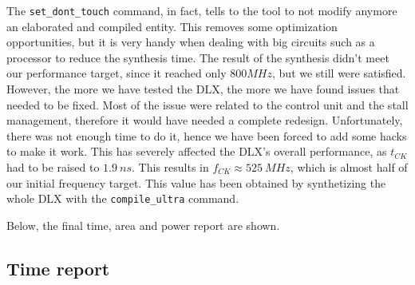 The \verb|set_dont_touch| command, in fact, tells to the tool to not modify anymore an elaborated and compiled entity. This removes some optimization opportunities, but it is very handy
when dealing with big circuits such as a processor to reduce the synthesis time.
The result of the synthesis didn't meet our performance target, since it reached only $800 MHz$, but we still were satisfied. However, the more we have tested the DLX, the more we have found
issues that needed to be fixed. Most of the issue were related to the control unit and the stall management, therefore it would have needed a complete redesign. Unfortunately, there was not enough
time to do it, hence we have been forced to add some hacks to make it work. This has severely affected the DLX's overall performance, as $t_{CK}$ had to be raised to $1.9\ ns$. This results in
$f_{CK} \approx 525\ MHz$, which is almost half of our initial frequency target. This value has been obtained by synthetizing the whole DLX with the \verb|compile_ultra| command.

Below, the final time, area and power report are shown.

\subsection{Time report}

